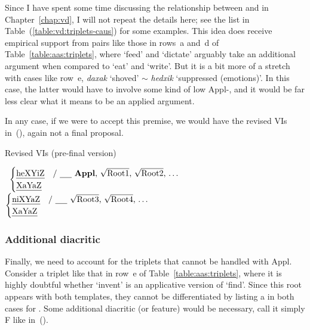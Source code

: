 \begin{exe}
\begin{xlist}
\begin{exe}
\begin{exe}
\begin{xlist}
\begin{exe}
\begin{exe}
\begin{exe}
\begin{exe}
\begin{exe}
\begin{xlist}
\begin{exe}
\begin{exe}
\begin{xlist}
\begin{exe}
\begin{xlist}
Since I have spent some time discussing the relationship between {\tkal} and {\thif} in Chapter~\ref{chap:vd}, I will not repeat the details here; see the list in Table~(\ref{table:vd:triplets-caus}) for some examples. This idea does receive empirical support from pairs like those in rows~a and~d of Table~\ref{table:aas:triplets}, where `feed' and `dictate' arguably take an additional argument when compared to `eat' and `write'. But it is a bit more of a stretch with cases like row~e, \emph{daxak} `shoved' $\sim$ \emph{hedxik} `suppressed (emotions)'. In this case, the latter would have to involve some kind of low Appl-, and it would be far less clear what it means to be an applied argument.

In any case, if we were to accept this premise, we would have the revised VIs in~(\nextx), again not a final proposal.

 \begin{exe}
 \ex  Revised VIs (pre-final version) 
 \begin{xlist} 
 	\ex  {\vds} \lra~$\begin{cases} 
		\text{\thif} & \text{/ \trace~\textbf{Appl}, \root{Root1}, \root{Root2}, \dots}\\
		\text{\tkal} & \\
		\end{cases}$
 	\ex  {\vzs} \lra~$\begin{cases} 
		\text{\tnif} & \text{/ \trace~\root{Root3}, \root{Root4}, \dots}\\
		\text{\tkal} & \\
		\end{cases}$
 \z
\z 

		\subsubsection{Additional diacritic}
Finally, we need to account for the triplets that cannot be handled with Appl. Consider a triplet like that in row~e of Table~\ref{table:aas:triplets}, where it is highly doubtful whether `invent' is an applicative version of `find'. Since this root appears with both templates, they cannot be differentiated by listing a  in both cases for {\vds}. Some additional diacritic (or feature) would be necessary, call it simply F like in~(\nextx).


\end{xlist}
\end{exe}
\end{xlist}
\end{exe}
\end{xlist}
\end{exe}
\end{exe}
\end{xlist}
\end{exe}
\end{exe}
\end{exe}
\end{exe}
\end{exe}
\end{xlist}
\end{exe}
\end{exe}
\end{xlist}
\end{exe}

